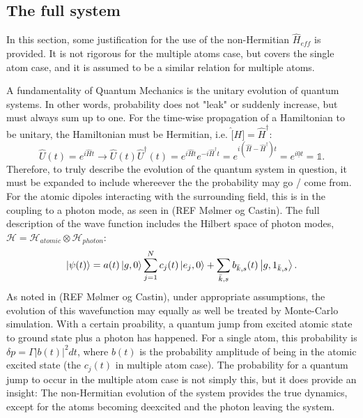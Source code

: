 \documentclass{article}
\begin{document}
\subsection{The full system}\label{sec:full_system}
In this section, some justification for the use of the non-Hermitian $\hat{H}_{eff}$ is provided. It is not rigorous for the multiple atoms case, but covers the single atom case, and it is assumed to be a similar relation for multiple atoms. 

A fundamentality of Quantum Mechanics is the unitary evolution of quantum systems. In other words, probability does not "leak" or suddenly increase, but must always sum up to one. For the time-wise propagation of a Hamiltonian to be unitary, the Hamiltonian must be Hermitian, i.e. $\hat[H] = \hat{H}^\dagger$:
\begin{equation}\label{eq:unitarity}
    \hat{U}(t) = e^{i \hat{H} t} \rightarrow \hat{U}(t) \hat{U}^\dagger(t) = e^{i \hat{H} t} e^{-i \hat{H}^\dagger t} = e^{i(\hat{H}-\hat{H}^\dagger) t} = e^{i \underline{0} t} = \mathds{1}.
\end{equation}
Therefore, to truly describe the evolution of the quantum system in question, it must be expanded to include whereever the the probability may go / come from. For the atomic dipoles interacting with the surrounding field, this is in the coupling to a photon mode, as seen in (REF Mølmer og Castin). The full description of the wave function includes the Hilbert space of photon modes, $\mathscr{H} = \mathscr{H}_{atomic} \otimes \mathscr{H}_{photon}$:
\begin{equation}\label{eq:full_wave_function}
    \ket{\psi(t)} = a(t) \ket{g, 0} \sum_{j=1}^N c_j(t) \ket{e_j, 0} + \sum_{\bar{k},s} b_{\bar{k},s} (t) \ket{g, 1_{\bar{k},s}}.
\end{equation}
As noted in (REF Mølmer og Castin), under appropriate assumptions, the evolution of this wavefunction may equally as well be treated by Monte-Carlo simulation. With a certain proability, a quantum jump from excited atomic state to ground state plus a photon has happened. For a single atom, this probability is $\delta p = \Gamma |b(t)|^2 dt$, where $b(t)$ is the probability amplitude of being in the atomic excited state (the $c_j (t)$ in multiple atom case). The probability for a quantum jump to occur in the multiple atom case is not simply this, but it does provide an insight: The non-Hermitian evolution of the system provides the true dynamics, except for the atoms becoming deexcited and the photon leaving the system. 
\end{document}
